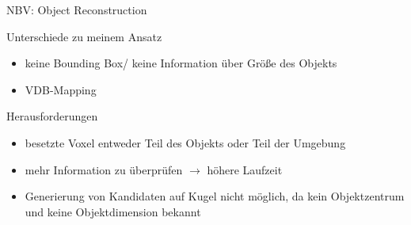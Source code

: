 \documentclass{beamer}
\begin{document}
\begin{frame}{NBV: Object Reconstruction}
	\begin{block}{Unterschiede zu meinem Ansatz}
		\begin{itemize}
			\item keine Bounding Box/ keine Information über Größe des Objekts
			\item VDB-Mapping
		\end{itemize}
	\end{block}
	\begin{exampleblock}{Herausforderungen}
		\begin{itemize}
			\item besetzte Voxel entweder Teil des Objekts oder Teil der Umgebung
			\item mehr Information zu überprüfen $\to$ höhere Laufzeit
			\item Generierung von Kandidaten auf Kugel nicht möglich, da kein Objektzentrum und keine Objektdimension bekannt
		\end{itemize}
	\end{exampleblock}

\end{frame}
\end{document}
